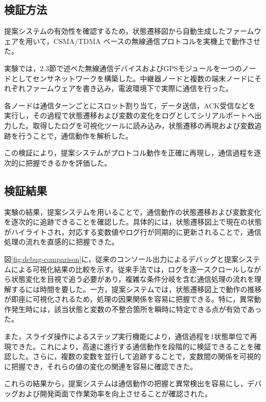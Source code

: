 \documentclass[technicalreport]{ieicej}
\begin{document}
\subsection{検証方法}
提案システムの有効性を確認するため，状態遷移図から自動生成したファームウェアを用いて，CSMA/TDMA ベースの無線通信プロトコルを実機上で動作させた。

実験では，2.3節で述べた無線通信デバイスおよびGPSモジュールを一つのノードとしてセンサネットワークを構築した。中継器ノードと複数の端末ノードにそれぞれファームウェアを書き込み，電波環境下で実際に通信を行った。

各ノードは通信ターンごとにスロット割り当て，データ送信，ACK受信などを実行し，その過程で状態遷移および変数の変化をログとしてシリアルポートへ出力した。取得したログを可視化ツールに読み込み，状態遷移の再現および変数追跡を行うことで，通信動作を解析した。

この検証により，提案システムがプロトコル動作を正確に再現し，通信過程を逐次的に把握できるかを評価した。

\subsection{検証結果}
実験の結果，提案システムを用いることで，通信動作の状態遷移および変数変化を逐次的に追跡できることを確認した。具体的には，状態遷移図上で現在の状態がハイライトされ，対応する変数値やログ行が同期的に更新されることで，通信処理の流れを直感的に把握できた。

図\ref{fig:debug-comparison}に，従来のコンソール出力によるデバッグと提案システムによる可視化結果の比較を示す。従来手法では，ログを逐一スクロールしながら状態変化を目視で追う必要があり，複雑な条件分岐を含む通信処理の流れを理解するには時間を要した。一方，提案システムでは，状態遷移図上で動作の推移が即座に可視化されるため，処理の因果関係を容易に把握できる。特に，異常動作発生時には，該当状態と変数の不整合箇所を瞬時に特定できる点が有効であった。

また，スライダ操作によるステップ実行機能により，通信過程を1状態単位で再現できた。これにより，高速に進行する通信動作を段階的に検証できることを確認した。さらに，複数の変数を並行して追跡することで，変数間の関係を可視的に把握でき，それらの値の変化の関連を容易に確認できた。

これらの結果から，提案システムは通信動作の把握と異常検出を容易にし，デバッグおよび開発両面で作業効率を向上させることが確認された。
\end{document}
